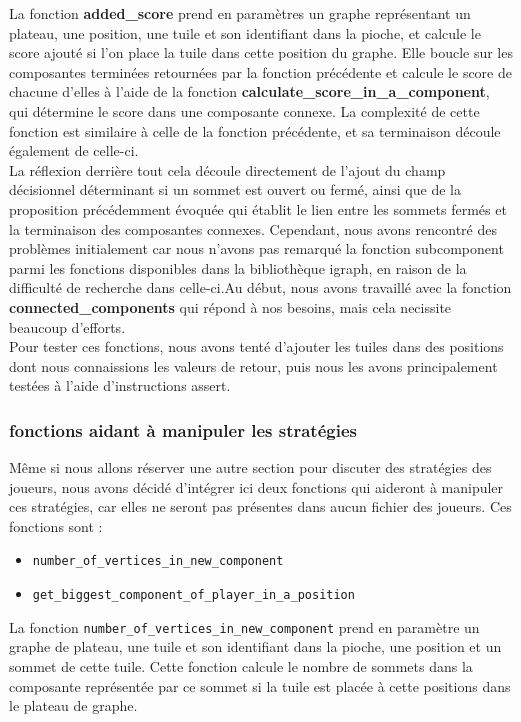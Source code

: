 \documentclass[10pt]{article}
\begin{document}
La fonction \textbf{added\_score} prend en paramètres un graphe représentant un plateau, une position, une tuile et son identifiant dans la pioche, et calcule le score ajouté si l'on place la tuile dans cette position du graphe. Elle boucle sur les composantes terminées retournées par la fonction précédente et calcule le score de chacune d'elles à l'aide de la fonction \textbf{calculate\_score\_in\_a\_component}, qui détermine le score dans une composante connexe. La complexité de cette fonction est similaire à celle de la fonction précédente, et sa terminaison découle également de celle-ci.\\
La réflexion derrière tout cela découle directement de l'ajout du champ décisionnel déterminant si un sommet est ouvert ou fermé, ainsi que de la proposition précédemment évoquée qui établit le lien entre les sommets fermés et la terminaison des composantes connexes. Cependant, nous avons rencontré des problèmes initialement car nous n'avons pas remarqué la fonction subcomponent parmi les fonctions disponibles dans la bibliothèque igraph, en raison de la difficulté de recherche dans celle-ci.Au début, nous avons travaillé avec la fonction \textbf{connected\_components} qui répond à nos besoins, mais cela necissite beaucoup d'efforts.\\

Pour tester ces fonctions, nous avons tenté d'ajouter les tuiles dans des positions dont nous connaissions les valeurs de retour, puis nous les avons principalement testées à l'aide d'instructions assert.
\\

\subsubsection{fonctions aidant à manipuler les stratégies}
Même si nous allons réserver une autre section pour discuter des stratégies des joueurs, nous avons décidé d'intégrer ici deux fonctions qui aideront à manipuler ces stratégies, car elles ne seront pas présentes dans aucun fichier des joueurs. Ces fonctions sont :
\begin{itemize}
    \item \texttt{number\_of\_vertices\_in\_new\_component}
    \item \texttt{get\_biggest\_component\_of\_player\_in\_a\_position}
\end{itemize}
La fonction \texttt{number\_of\_vertices\_in\_new\_component} prend en paramètre un graphe de plateau, une tuile et son identifiant dans la pioche, une position et un sommet de cette tuile. Cette fonction calcule le nombre de sommets dans la composante représentée par ce sommet si la tuile est placée à cette positions dans le plateau de graphe.\\
\end{document}
